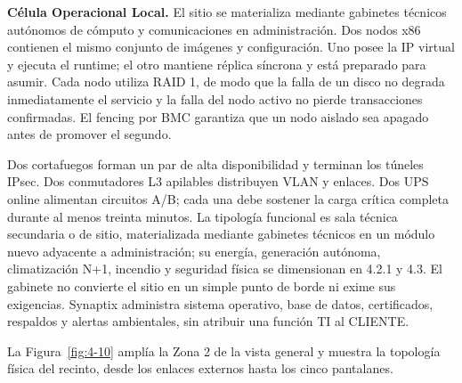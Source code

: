 \textbf{Célula Operacional Local.} El sitio se materializa mediante gabinetes técnicos autónomos de cómputo y comunicaciones en administración. Dos nodos x86 contienen el mismo conjunto de imágenes y configuración. Uno posee la IP virtual y ejecuta el runtime; el otro mantiene réplica síncrona y está preparado para asumir. Cada nodo utiliza RAID 1, de modo que la falla de un disco no degrada inmediatamente el servicio y la falla del nodo activo no pierde transacciones confirmadas. El fencing por BMC garantiza que un nodo aislado sea apagado antes de promover el segundo.

Dos cortafuegos forman un par de alta disponibilidad y terminan los túneles IPsec. Dos conmutadores L3 apilables distribuyen VLAN y enlaces. Dos UPS online alimentan circuitos A/B; cada una debe sostener la carga crítica completa durante al menos treinta minutos. La tipología funcional es sala técnica secundaria o de sitio, materializada mediante gabinetes técnicos en un módulo nuevo adyacente a administración; su energía, generación autónoma, climatización N+1, incendio y seguridad física se dimensionan en 4.2.1 y 4.3. El gabinete no convierte el sitio en un simple punto de borde ni exime sus exigencias. Synaptix administra sistema operativo, base de datos, certificados, respaldos y alertas ambientales, sin atribuir una función TI al CLIENTE.

La Figura~\ref{fig:4-10} amplía la Zona 2 de la vista general y muestra la topología física del recinto, desde los enlaces externos hasta los cinco pantalanes.



